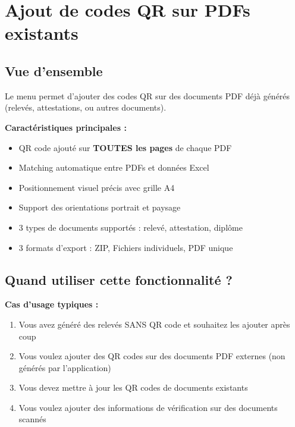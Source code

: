 \section{Ajout de codes QR sur PDFs existants}

\subsection{Vue d'ensemble}

Le menu  permet d'ajouter des codes QR sur des documents PDF déjà générés (relevés, attestations, ou autres documents).


\textbf{Caractéristiques principales :}
\begin{itemize}[leftmargin=*]
    \item QR code ajouté sur \textbf{TOUTES les pages} de chaque PDF
    \item Matching automatique entre PDFs et données Excel
    \item Positionnement visuel précis avec grille A4
    \item Support des orientations portrait et paysage
    \item 3 types de documents supportés : relevé, attestation, diplôme
    \item 3 formats d'export : ZIP, Fichiers individuels, PDF unique
\end{itemize}

\subsection{Quand utiliser cette fonctionnalité ?}

\textbf{Cas d'usage typiques :}

\begin{enumerate}[leftmargin=*]
    \item Vous avez généré des relevés SANS QR code et souhaitez les ajouter après coup
    \item Vous voulez ajouter des QR codes sur des documents PDF externes (non générés par l'application)
    \item Vous devez mettre à jour les QR codes de documents existants
    \item Vous voulez ajouter des informations de vérification sur des documents scannés
\end{enumerate}

